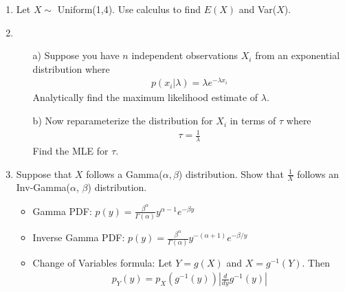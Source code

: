 \documentclass[10pt,a4paper]{article}
\begin{document}
\begin{enumerate}
\bigskip 

\item Let $X \sim$ Uniform(1,4). Use calculus to find $E(X)$ and Var($X$).

\bigskip 

\item 
\begin{enumerate}
\item[a)]
Suppose you have $n$ independent observations $X_i$ from an exponential distribution where 
\begin{eqnarray*}
p(x_i | \lambda) = \lambda e^{-\lambda x_i}
\end{eqnarray*}
Analytically find the maximum likelihood estimate of $\lambda$.
\medskip
\item[b)] Now reparameterize the distribution for $X_i$ in terms of $\tau$ where 
\begin{eqnarray*}
\tau = \frac{1}{\lambda}
\end{eqnarray*}
Find the MLE for $\tau$.
\end{enumerate}

\bigskip

\item Suppose that $X$ follows a Gamma($\alpha, \beta$) distribution.  Show that $\frac{1}{X}$ follows an Inv-Gamma($\alpha$, $\beta$) distribution.

\begin{itemize}
\item Gamma PDF: $p(y) = \frac{\beta^{\alpha}}{\Gamma(\alpha)} y^{\alpha-1} e^{-\beta y}$
\item Inverse Gamma PDF: $p(y) = \frac{\beta^{\alpha}}{\Gamma(\alpha)} y^{-(\alpha+1)} e^{-\beta/y}$
\item Change of Variables formula: Let $Y = g(X)$ and $X = g^{-1}(Y)$.  Then 
\begin{eqnarray*}
p_Y(y) = p_X(g^{-1}(y)) \left \vert \frac{d}{dy} g^{-1}(y) \right \vert
\end{eqnarray*}
\end{itemize}

\bigskip


\end{enumerate}
\end{document}
